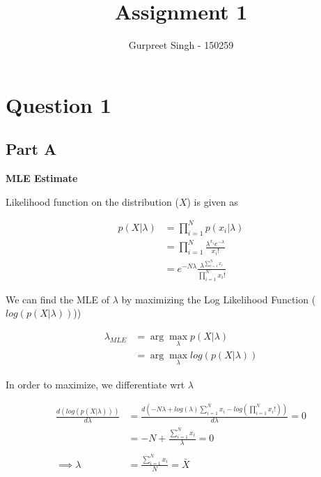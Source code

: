 \documentclass{article}
\title{Assignment 1}
\author{Gurpreet Singh - 150259}
\date{}
\begin{document}
\maketitle

\section*{Question 1}
\begin{addmargin}{1.5em}
    
    \subsection*{Part A}
    \begin{addmargin}{1.5em}
        
        \textbf{MLE Estimate}
        
        Likelihood function on the distribution ($X$) is given as
        
        \begin{align*}
            p(X | \lambda) &= \prod_{i = 1}^{N} p(x_i | \lambda) \\
                           &= \prod_{i = 1}^{N} \frac{\lambda^{x_i}e^{-\lambda}}{x_i!} \\
                           &= e^{-N\lambda} \frac{\lambda^{\sum_{i = 1}^{N} x_i}}{\prod_{i = 1}^{N} x_i!}
        \end{align*}
        
        We can find the MLE of $\lambda$ by maximizing the Log Likelihood Function ($log(p(X | \lambda))$))
        
        \begin{align*}
            \lambda_{MLE} &= \arg\max_{\lambda} p(X | \lambda) \\
                          &= \arg\max_{\lambda} log(p(X | \lambda))
        \end{align*}
        
        In order to maximize, we differentiate wrt $\lambda$
        
        \begin{align*}
            \frac{d(log(p(X | \lambda)))}{d\lambda} &= \frac{d (-N\lambda + log(\lambda)\sum_{i = 1}^{N} x_i - log(\prod_{i = 1}^{N} x_i!))}{d\lambda} = 0 \\
                                                   &= -N + \frac{\sum_{i = 1}^{N} x_i}{\lambda} = 0\\\\
            \implies \lambda                       &= \frac{\sum_{i = 1}^{N} x_i}{N} = \bar{X}
        \end{align*}
        

\end{addmargin}
\end{addmargin}
\end{document}
